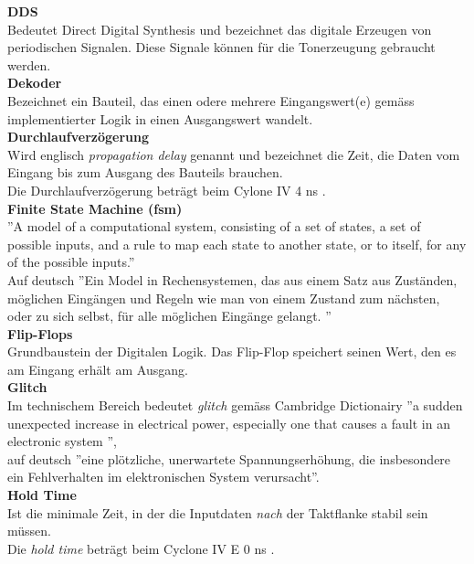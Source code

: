 \textbf{DDS}\\
Bedeutet Direct Digital Synthesis und bezeichnet das digitale Erzeugen von periodischen Signalen. Diese Signale können für die Tonerzeugung gebraucht werden. \\

\textbf{Dekoder}\\
Bezeichnet ein Bauteil, das einen odere mehrere Eingangswert(e) gemäss implementierter Logik in einen Ausgangswert wandelt. \\

\textbf{Durchlaufverzögerung}\\
Wird englisch \textit{propagation delay} genannt und bezeichnet die Zeit, die Daten vom Eingang bis zum Ausgang des Bauteils brauchen.\\
Die Durchlaufverzögerung beträgt beim Cylone IV 4 ns \cite{Handbook_Altera}.\\

\textbf{Finite State Machine (fsm)}\\
''A model of a computational system, consisting of a set of states, a set of possible inputs, and a rule to map each state to another state, or to itself, for any of the possible inputs.''\cite{fsm}\\
Auf deutsch ''Ein Model in Rechensystemen, das aus einem Satz aus Zuständen, möglichen Eingängen und Regeln wie man von einem Zustand zum nächsten, oder zu sich selbst, für alle möglichen Eingänge gelangt. ''\\

\textbf{Flip-Flops}\\
Grundbaustein der Digitalen Logik. Das Flip-Flop speichert seinen Wert, den es am Eingang erhält am Ausgang.\\

\textbf{Glitch}\\
Im technischem Bereich bedeutet \textit{glitch} gemäss Cambridge Dictionairy ''a sudden unexpected increase in electrical power, especially one that causes a fault in an electronic system ''\cite{dictionair},\\
auf deutsch ''eine plötzliche, unerwartete Spannungserhöhung, die insbesondere ein Fehlverhalten im elektronischen System verursacht''.\\

\textbf{Hold Time}\\
Ist die minimale Zeit, in der die Inputdaten \textit{nach} der Taktflanke stabil sein müssen.\\
Die \textit{hold time} beträgt beim  Cyclone IV E 0 ns \cite{Handbook_Altera}.\\

